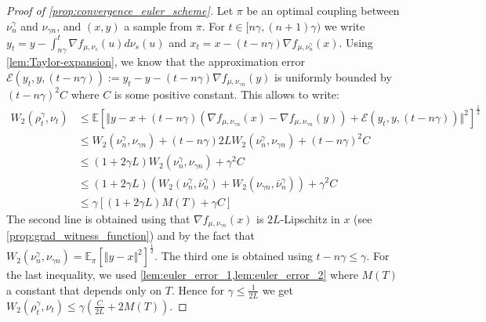 \begin{proof}[Proof of \cref{prop:convergence_euler_scheme}]\label{proof:prop:convergence_euler_scheme}
Let $\pi$ be an optimal coupling between $\nu_{n}^{\gamma}$ and $\nu_{\gamma n}$,
and $(x,y)$ a sample from $\pi$. For $t\in[n\gamma,(n+1)\gamma)$ we write $y_{t} =y-\int_{n\gamma}^{t}\nabla f_{\mu,\nu_{s}}(u)d\nu_{s}(u)$ and $x_{t}  =x-(t-n\gamma)\nabla f_{\mu,\nu_{n}^{\gamma}}(x)$. Using \cref{lem:Taylor-expansion}, we know that the approximation error $\mathcal{E}(y_{t},y,(t-n\gamma)):=y_{t}-y-(t-n\gamma)\nabla f_{\mu,\nu_{\gamma n}}(y)$ is uniformly bounded by $(t-n\gamma)^{2}C$ where $C$ is some positive constant. This allows to write:
\begin{align*}
W_{2}(\rho_{t}^{\gamma},\nu_{t}) & \leq\mathbb{E}\left[\Vert y-x+(t-n\gamma)(\nabla f_{\mu,\nu_{\gamma n}}(x)-\nabla f_{\mu,\nu_{\gamma n}}(y))+\mathcal{E}(y_{t},y,(t-n\gamma))\Vert^{2}\right]^{\frac{1}{2}}\\
 & \leq W_{2}(\nu_{n}^{\gamma},\nu_{\gamma n})+(t-n\gamma)2LW_{2}(\nu_{n}^{\gamma},\nu_{\gamma n})+(t-n\gamma)^{2}C\\
 & \leq(1+2\gamma L)W_{2}(\nu_{n}^{\gamma},\nu_{\gamma n})+\gamma^{2}C\\ &\leq(1+2\gamma L)( W_{2}(\nu_{n}^{\gamma},\bar{\nu}_{n}^{\gamma})+W_{2}(\nu_{\gamma n},\bar{\nu}_{n}^{\gamma}) )+\gamma^{2}C \\
 & \leq\gamma\left[(1+2\gamma L)M(T)+\gamma C\right]
\end{align*}
The second line is obtained using that $\nabla f_{\mu,\nu_{\gamma n}}(x)$ is $2L$-Lipschitz in $x$ (see \cref{prop:grad_witness_function}) and by the fact that $W_{2}(\nu_{n}^{\gamma},\nu_{\gamma n}) = \mathbb{E}_{\pi}[\Vert y-x\Vert^2]^{\frac12}$. The third one is obtained using $t-n \gamma\le \gamma$. For the last inequality, we used \cref{lem:euler_error_1,lem:euler_error_2}  where $M(T)$ a constant that depends only on $T$. Hence for $\gamma\leq\frac{1}{2L}$ we get $W_{2}(\rho_{t}^{\gamma},\nu_{t})\leq\gamma(\frac{C}{2L}+2M(T)).$
\end{proof}

